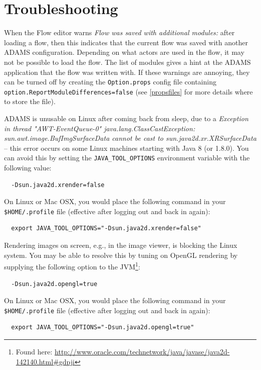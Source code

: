 \section{Troubleshooting}
\begin{tight_itemize}
  \item When the Flow editor warns \textit{Flow was saved with additional modules:} after loading
  a flow, then this indicates that the current flow was saved with another ADAMS configuration.
  Depending on what actors are used in the flow, it may not be possible to load the flow.
  The list of modules gives a hint at the ADAMS application that the flow was written with.
  If these warnings are annoying, they can be turned off by creating the \texttt{Option.props}
  config file containing \texttt{option.ReportModuleDifferences=false} (see \ref{propsfiles}
  for more details where to store the file).

  \item ADAMS is unusable on Linux after coming back from sleep, due to a
  \textit{Exception in thread "AWT-EventQueue-0" java.lang.ClassCastException:
  sun.awt.image.BufImgSurfaceData cannot be cast to sun.java2d.xr.XRSurfaceData}
  -- this error occurs on some Linux machines starting with Java 8 (or 1.8.0).
  You can avoid this by setting the \texttt{JAVA\_TOOL\_OPTIONS} environment variable with the following value:
  \begin{verbatim}
  -Dsun.java2d.xrender=false
  \end{verbatim}
  On Linux or Mac OSX, you would place the following command in your
  \texttt{\$HOME/.profile} file (effective after logging out and back in again):
  \begin{verbatim}
  export JAVA_TOOL_OPTIONS="-Dsun.java2d.xrender=false"
  \end{verbatim}

  \item Rendering images on screen, e.g., in the image viewer, is blocking the
  Linux system. You may be able to resolve this by tuning on OpenGL rendering
  by supplying the following option to the JVM\footnote{Found here: \url{http://www.oracle.com/technetwork/java/javase/java2d-142140.html\#gdpji}{}}:
  \begin{verbatim}
  -Dsun.java2d.opengl=true
  \end{verbatim}
  On Linux or Mac OSX, you would place the following command in your
  \texttt{\$HOME/.profile} file (effective after logging out and back in again):
  \begin{verbatim}
  export JAVA_TOOL_OPTIONS="-Dsun.java2d.opengl=true"
  \end{verbatim}


\end{tight_itemize}
